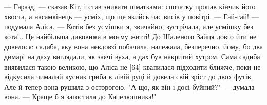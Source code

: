 — Гаразд, — сказав Кіт, і став зникати шматками: спочатку пропав кінчик його хвоста, а насамкінець — усміх, що ще якийсь час висів у повітрі.
— Гай-гай! — подумала Аліса. — Котів без усмішки я, звичайно, зустрічала, але усмішку без кота!.. Це найбільша дивовижа в моєму житті!
До Шаленого Зайця довго йти не довелося: садиба, яку вона невдовзі побачила, належала, безперечно, йому, бо два димарі на даху виглядали, як заячі вуха, а дах був накритий хутром. Сама садиба виявилася такою великою, що Аліса не [64] квапилася підходити ближче, поки не відкусила чималий кусник гриба в лівій руці й довела свій зріст до двох футів. Але й тепер вона рушила з осторогою.
"А що, як він і досі буйний?" — думала вона. — Краще б я загостила до Капелюшника!"
